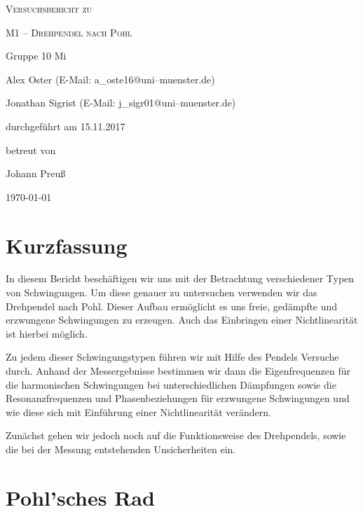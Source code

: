 \documentclass[11pt,a4paper,titlepage, ngerman]{article}
\begin{document}
	\begin{titlepage}
		
		\centering
		{\scshape\LARGE Versuchsbericht zu \par}
		\vspace{1cm}
		{\scshape\huge M1 -- Drehpendel nach Pohl\par}
		\vspace{2.5cm}
		{\LARGE Gruppe 10 Mi\par}
		\vspace{0.5cm}
		{\large Alex Oster (E-Mail: a\_oste16@uni--muenster.de) \par}
		{\large Jonathan Sigrist (E-Mail: j\_sigr01@uni--muenster.de) \par}
		\vfill
		durchgeführt am 15.11.2017\par
		betreut von\par
		{\large Johann Preuß}		
		\vfill	
		{\large \today\par}
		
	\end{titlepage}
		
	\tableofcontents
		
	\newpage
	
	\section{Kurzfassung}
		
		In diesem Bericht beschäftigen wir uns mit der Betrachtung verschiedener Typen von Schwingungen. Um diese genauer zu untersuchen verwenden wir das \glqq Drehpendel nach Pohl\grqq {}. Dieser Aufbau ermöglicht es uns freie, gedämpfte und erzwungene Schwingungen zu erzeugen. Auch das Einbringen einer Nichtlinearität ist hierbei möglich.	
			
		Zu jedem dieser Schwingungstypen führen wir mit Hilfe des Pendels Versuche durch. Anhand der Messergebnisse bestimmen wir dann die Eigenfrequenzen für die harmonischen Schwingungen bei unterschiedlichen Dämpfungen sowie die Resonanzfrequenzen und Phasenbeziehungen für erzwungene Schwingungen und wie diese sich mit Einführung einer Nichtlinearität verändern. 
		
		Zunächst gehen wir jedoch noch auf die Funktionsweise des Drehpendels, sowie die bei der Messung entstehenden Unsicherheiten ein.  		 
		
	\section{Pohl'sches Rad}
		
\end{document}
